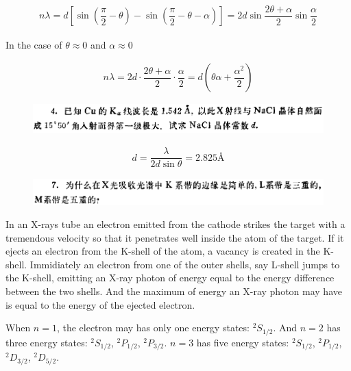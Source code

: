\documentclass{article}
\begin{document}
\begin{equation*}
  \begin{aligned}
    n \lambda = d \left[ \sin \left( \dfrac{\pi}{2} - \theta  \right) - \sin \left( \dfrac{\pi}{2} - \theta - \alpha \right) \right] = 2 d \sin \dfrac{2 \theta + \alpha}{2} \sin \dfrac{\alpha}{2}  
  \end{aligned}
\end{equation*}

In the case of $\theta \approx 0$ and $\alpha \approx 0$

\begin{equation*}
  \begin{aligned}
    n \lambda = 2 d \cdot \dfrac{2 \theta + \alpha}{2}  \cdot \dfrac{\alpha}{2} = d \left( \theta \alpha + \dfrac{\alpha^2}{2}  \right)
  \end{aligned}
\end{equation*}

\begin{figure}[H]
  \centering
  \includegraphics[width=\linewidth]{figures/Problem4}
  \label{fig:}
\end{figure}

\begin{equation*}
  \begin{aligned}
    d = \dfrac{\lambda}{2 d \sin \theta} = 2.825 \si{\angstrom} 
  \end{aligned}
\end{equation*}

\begin{figure}[H]
  \centering
  \includegraphics[width=\linewidth]{figures/Problem7}
  \label{fig:}
\end{figure}

In an X-rays tube an electron emitted from the cathode strikes the target with a tremendous velocity so that it penetrates well inside the atom of the target. If it ejects an electron from the K-shell of the atom, a vacancy is created in the K-shell. Immidiately an electron from one of the outer shells, say L-shell jumps to the K-shell, emitting an X-ray photon of energy equal to the energy difference between the two shells. And the maximum of energy an X-ray photon may have is equal to the energy of the ejected electron.

When $n=1$, the electron may has only one energy states: ${}^2S_{1/2}$. And $n=2$ has three energy states: ${}^2S_{1/2}$, ${}^2P_{1/2}$, ${}^2P_{3/2}$. $n=3$ has five energy states: ${}^2S_{1/2}$, ${}^2P_{1/2}$, ${}^2D_{3/2}$, ${}^2D_{5/2}$.
\end{document}

